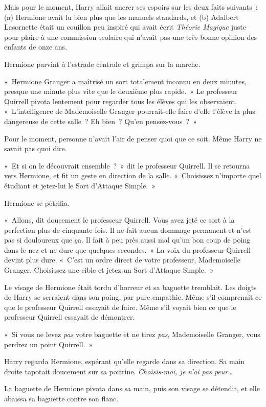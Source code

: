 Mais pour le moment, Harry allait ancrer ses espoirs sur les deux faits suivants~: (a) Hermione avait lu bien plus que les manuels standards, et (b) Adalbert Lasornette était un couillon peu inspiré qui avait écrit \emph{Théorie Magique} juste pour plaire à une commission scolaire qui n'avait pas une très bonne opinion des enfants de onze ans.

Hermione parvint à l'estrade centrale et grimpa sur la marche.

«~Hermione Granger a maîtrisé un sort totalement inconnu en deux minutes, presque une minute plus vite que le deuxième plus rapide.~» Le professeur Quirrell pivota lentement pour regarder tous les élèves qui les observaient. «~L'intelligence de Mademoiselle Granger pourrait-elle faire d'elle l'élève la plus dangereuse de cette salle~? Eh bien~? Qu'en pensez-vous~?~»

Pour le moment, personne n'avait l'air de penser quoi que ce soit. Même Harry ne savait pas quoi dire.

«~Et si on le découvrait ensemble~?~» dit le professeur Quirrell. Il se retourna vers Hermione, et fit un geste en direction de la salle. «~Choisissez n'importe quel étudiant et jetez-lui le Sort d'Attaque Simple.~»

Hermione se pétrifia.

«~Allons, dit doucement le professeur Quirrell. Vous avez jeté ce sort à la perfection plus de cinquante fois. Il ne fait aucun dommage permanent et n'est pas si douloureux que ça. Il fait à peu près aussi mal qu'un bon coup de poing dans le nez et ne dure que quelques secondes.~» La voix du professeur Quirrell devint plus dure. «~C'est un ordre direct de votre professeur, Mademoiselle Granger. Choisissez une cible et jetez un Sort d'Attaque Simple.~»

Le visage de Hermione était tordu d'horreur et sa baguette tremblait. Les doigts de Harry se serraient dans son poing, par pure empathie. Même s'il comprenait ce que le professeur Quirrell essayait de faire. Même s'il voyait bien ce que le professeur Quirrell essayait de démontrer.

«~Si vous ne levez \emph{pas} votre baguette et ne tirez \emph{pas}, Mademoiselle Granger, vous perdrez un point Quirrell.~»

Harry regarda Hermione, espérant qu'elle regarde dans sa direction. Sa main droite tapotait doucement sur sa poitrine. \emph{Choisis-moi, je n'ai pas peur…}

La baguette de Hermione pivota dans sa main, puis son visage se détendit, et elle abaissa sa baguette contre son flanc.

